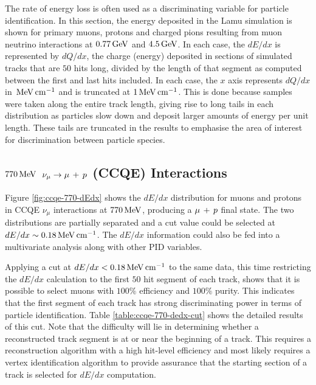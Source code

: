 The rate of energy loss is often used as a discriminating variable for particle identification. In this section, the energy deposited in the Lamu simulation is shown for primary muons, protons and charged pions resulting from muon neutrino interactions at $0.77\,\mathrm{GeV}$ and $4.5\,\mathrm{GeV}$. In each case, the $dE/dx$ is represented by $dQ/dx$, the charge (energy) deposited in sections of simulated tracks that are $50$ hits long, divided by the length of that segment as computed between the first and last hits included. In each case, the $x$ axis represents $dQ/dx$ in $\,\mathrm{MeV} \,\mathrm{cm}^{-1}$ and is truncated at $1 \,\mathrm{MeV}\,\mathrm{cm}^{-1}$. This is done because samples were taken along the entire track length, giving rise to long tails in each distribution as particles slow down and deposit larger amounts of energy per unit length. These tails are truncated in the results to emphasise the area of interest for discrimination between particle species.

\subsection{$770\,\mathrm{MeV}$ $\nu_\mu \rightarrow \mu\,+\,p$ (CCQE) Interactions}
Figure \ref{fig:ccqe-770-dEdx} shows the $dE/dx$ distribution for muons and protons in \acs{CCQE} $\nu_\mu$ interactions at $770\,\mathrm{MeV}$, producing a $\mu\,+\,p$ final state. The two distributions are partially separated and a cut value could be selected at $dE/dx \sim 0.18 \,\mathrm{MeV}\,\mathrm{cm}^{-1}$. The $dE/dx$ information could also be fed into a multivariate analysis along with other \acs{PID} variables.

Applying a cut at $dE/dx < 0.18 \,\mathrm{MeV} \,\mathrm{cm}^{-1}$ to the same data, this time restricting the $dE/dx$ calculation to the first $50$ hit segment of each track, shows that it is possible to select muons with $100\%$ efficiency and $100\%$ purity. This indicates that the first segment of each track has strong discriminating power in terms of particle identification. Table \ref{table:ccqe-770-dedx-cut} shows the detailed results of this cut. Note that the difficulty will lie in determining whether a reconstructed track segment is at or near the beginning of a track. This requires a reconstruction algorithm with a high hit-level efficiency and most likely requires a vertex identification algorithm to provide assurance that the starting section of a track is selected for $dE/dx$ computation.

